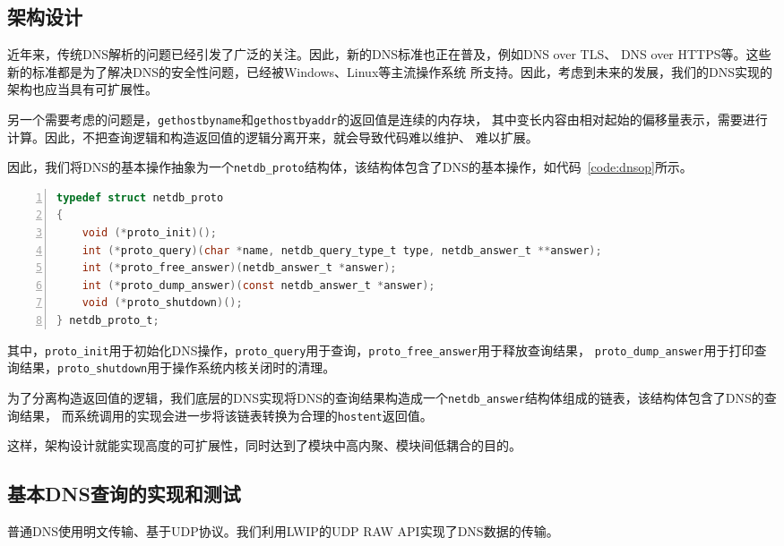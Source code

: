\documentclass[a4paper,twoside]{ctexrep}
\begin{document}
\begin{spacing}{1.2}
\subsection{架构设计}

近年来，传统DNS解析的问题已经引发了广泛的关注。因此，新的DNS标准也正在普及，例如DNS over TLS、
DNS over HTTPS等。这些新的标准都是为了解决DNS的安全性问题，已经被Windows、Linux等主流操作系统
所支持。因此，考虑到未来的发展，我们的DNS实现的架构也应当具有可扩展性。

另一个需要考虑的问题是，\texttt{gethostbyname}和\texttt{gethostbyaddr}的返回值是连续的内存块，
其中变长内容由相对起始的偏移量表示，需要进行计算。因此，不把查询逻辑和构造返回值的逻辑分离开来，就会导致代码难以维护、
难以扩展。

因此，我们将DNS的基本操作抽象为一个\texttt{netdb\_proto}结构体，该结构体包含了DNS的基本操作，如代码~\ref{code:dnsop}所示。
\begin{lstlisting}[numbers=left,style=CppStyle,caption={DNS操作结构体},label={code:dnsop},language=C]
typedef struct netdb_proto
{
	void (*proto_init)();
	int (*proto_query)(char *name, netdb_query_type_t type, netdb_answer_t **answer);
	int (*proto_free_answer)(netdb_answer_t *answer);
	int (*proto_dump_answer)(const netdb_answer_t *answer);
	void (*proto_shutdown)();
} netdb_proto_t;
\end{lstlisting}
其中，\texttt{proto\_init}用于初始化DNS操作，\texttt{proto\_query}用于查询，\texttt{proto\_free\_answer}用于释放查询结果，
\texttt{proto\_dump\_answer}用于打印查询结果，\texttt{proto\_shutdown}用于操作系统内核关闭时的清理。

为了分离构造返回值的逻辑，我们底层的DNS实现将DNS的查询结果构造成一个\texttt{netdb\_answer}结构体组成的链表，该结构体包含了DNS的查询结果，
而系统调用的实现会进一步将该链表转换为合理的\texttt{hostent}返回值。

这样，架构设计就能实现高度的可扩展性，同时达到了模块中高内聚、模块间低耦合的目的。

\subsection{基本DNS查询的实现和测试}

普通DNS使用明文传输、基于UDP协议。我们利用LWIP的UDP RAW API实现了DNS数据的传输。


\end{spacing}
\end{document}
